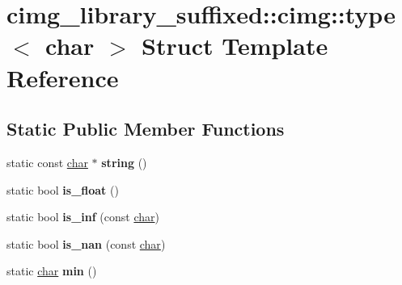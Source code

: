 \hypertarget{structcimg__library__suffixed_1_1cimg_1_1type_3_01char_01_4}{}\section{cimg\+\_\+library\+\_\+suffixed\+:\+:cimg\+:\+:type$<$ char $>$ Struct Template Reference}
\label{structcimg__library__suffixed_1_1cimg_1_1type_3_01char_01_4}
\subsection*{Static Public Member Functions}
\begin{DoxyCompactItemize}
\item 
\mbox{\label{structcimg__library__suffixed_1_1cimg_1_1type_3_01char_01_4_a222449afa23aac98baaba5fd6e43456d}} 
static const \hyperlink{classchar}{char} $\ast$ {\bfseries string} ()
\item 
\mbox{\label{structcimg__library__suffixed_1_1cimg_1_1type_3_01char_01_4_a9042150f3ee351ba1cc65c7ef6fa913b}} 
static bool {\bfseries is\+\_\+float} ()
\item 
\mbox{\label{structcimg__library__suffixed_1_1cimg_1_1type_3_01char_01_4_a3262971b1b7d438c1c2fd40261911fd4}} 
static bool {\bfseries is\+\_\+inf} (const \hyperlink{classchar}{char})
\item 
\mbox{\label{structcimg__library__suffixed_1_1cimg_1_1type_3_01char_01_4_af0acf41ce0d7be016b15ee630f8ae95f}} 
static bool {\bfseries is\+\_\+nan} (const \hyperlink{classchar}{char})
\item 
\mbox{\label{structcimg__library__suffixed_1_1cimg_1_1type_3_01char_01_4_a271d2bea754ec796bbf82c8891c56bfc}} 
static \hyperlink{classchar}{char} {\bfseries min} ()
\item 
\mbox{\label{structcimg__library__suffixed_1_1cimg_1_1type_3_01char_01_4_a0b78f909d162b8a3b33e18dbf4f8c6e2}} 

\end{DoxyCompactItemize}
